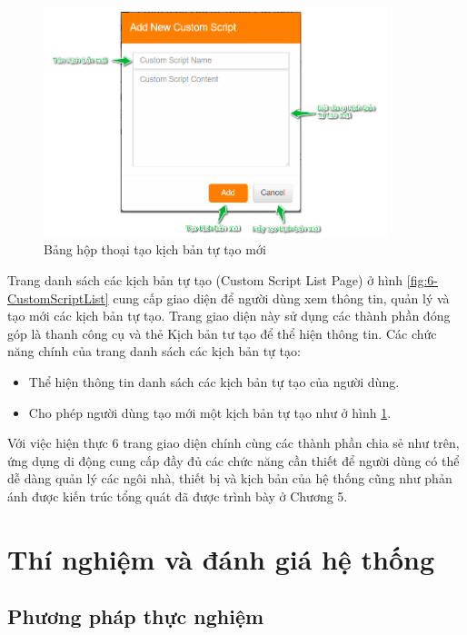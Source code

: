 \documentclass[12pt,a4paper,oneside]{extbook}
\begin{document}
\begin{figure}[h]
  \centering
     \includegraphics[width=10cm]{6-AddCustomScript}
  \caption{Bảng hộp thoại tạo kịch bản tự tạo mới}\label{fig:6-AddCustomScript}
\end{figure}

\noindent
Trang danh sách các kịch bản tự tạo (Custom Script List Page) ở hình \ref{fig:6-CustomScriptList} cung cấp giao diện để người dùng xem thông tin, quản lý và tạo mới các kịch bản tự tạo. Trang giao diện này sử dụng các thành phần đóng góp là thanh công cụ và thẻ Kịch bản tư tạo để thể hiện thông tin. Các chức năng chính của trang danh sách các kịch bản tự tạo:

\begin{itemize}[topsep=1mm,itemsep=-0.5mm]
\item Thể hiện thông tin danh sách các kịch bản tự tạo của người dùng.
\item Cho phép người dùng tạo mới một kịch bản tự tạo như ở hình \ref{fig:6-AddCustomScript}.
\vspace{1mm}
\end{itemize}

\noindent
Với việc hiện thực 6 trang giao diện chính cùng các thành phần chia sẻ như trên, ứng dụng di động cung cấp đầy đủ các chức năng cần thiết để người dùng có thể dễ dàng quản lý các ngôi nhà, thiết bị và kịch bản của hệ thống cũng như phản ánh được kiến trúc tổng quát đã được trình bày ở Chương 5.

\chapter{Thí nghiệm và đánh giá hệ thống}
\section{Phương pháp thực nghiệm}
\end{document}
